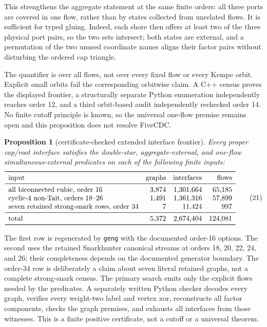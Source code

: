\documentclass[11pt]{article}
\newtheorem{proposition}[theorem]{Proposition}
\theoremstyle{definition}
\theoremstyle{remark}
\begin{document}
This strengthens the aggregate statement at the same finite orders: all
three ports are covered in one flow, rather than by states collected from
unrelated flows.  It is sufficient for typed gluing.  Indeed, each shore
then offers at least two of the three physical port pairs, so the two sets
intersect; both states are external, and a permutation of the two unused
coordinate names aligns their factor pairs without disturbing the ordered
cap triangle.

The quantifier is over all flows, not over every fixed flow or every Kempe
orbit.  Explicit small orbits fail the corresponding orbitwise claim.  A
C++ census proves the displayed frontier, a structurally separate Python
enumeration independently reaches order 12, and a third orbit-based audit
independently rechecked order 14.  No finite cutoff principle is known, so
the universal one-flow premise remains open and this proposition does not
resolve FiveCDC.

\begin{proposition}[certificate-checked extended interface frontier]
\label{prop:extended-interface-frontier}
Every proper cap/root interface satisfies the double-star,
aggregate-external, and one-flow simultaneous-external predicates on each
of the following finite inputs:
\[
\begin{array}{lrrr}
\toprule
\text{input}&\text{graphs}&\text{interfaces}&\text{flows}\\
\midrule
\text{all biconnected cubic, order 16}&3{,}874&1{,}301{,}664&65{,}185\\
\text{cyclic-4 non-Tait, orders 18--26}&1{,}491&1{,}361{,}316&57{,}899\\
\text{seven retained strong-snark rows, order 34}&7&11{,}424&997\\
\midrule
\text{total}&5{,}372&2{,}674{,}404&124{,}081\\
\bottomrule
\end{array}                                                    \tag{21}
\]
\end{proposition}

The first row is regenerated by \texttt{geng} with the documented order-16
options.  The second
uses the retained Snarkhunter canonical streams at orders 18, 20, 22, 24,
and 26; their completeness depends on the documented generator boundary.
The order-34 row is deliberately a claim about seven literal retained
graphs, not a complete strong-snark census.  The primary search emits only
the explicit flows needed by the predicates.  A separately written Python
checker decodes every graph, verifies every weight-two label and vertex xor,
reconstructs all factor components, checks the graph premises, and exhausts
all interfaces from those witnesses.  This is a finite positive certificate,
not a cutoff or a universal theorem.
\end{document}
